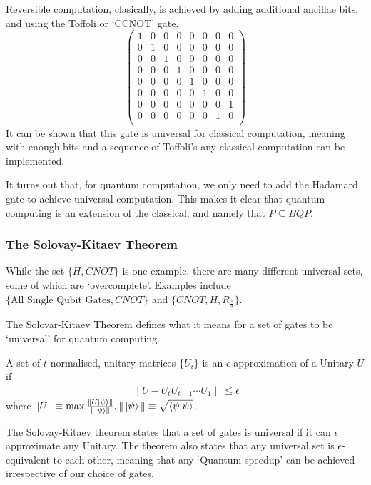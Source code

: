 \documentclass[11pt]{article}
\begin{document}
Reversible computation, clasically, is achieved by adding additional ancillae bits, and using the Toffoli or `CCNOT' gate.
\begin{equation}
    \begin{pmatrix}
        1 & 0 & 0 & 0 & 0 & 0 & 0 & 0\\
        0 & 1 & 0 & 0 & 0 & 0 & 0 & 0\\
        0 & 0 & 1 & 0 & 0 & 0 & 0 & 0\\
        0 & 0 & 0 & 1 & 0 & 0 & 0 & 0\\
        0 & 0 & 0 & 0 & 1 & 0 & 0 & 0\\
        0 & 0 & 0 & 0 & 0 & 1 & 0 & 0\\
        0 & 0 & 0 & 0 & 0 & 0 & 0 & 1\\
        0 & 0 & 0 & 0 & 0 & 0 & 1 & 0\\
    \end{pmatrix}
\end{equation}
It can be shown that this gate is universal for classical computation, meaning with enough bits and a sequence of Toffoli's any classical computation can be implemented.

It turns out that, for quantum computation, we only need to add the Hadamard gate to achieve universal computation. This makes it clear that quantum computing is an extension of the classical, and namely that $P \subseteq BQP$.

\subsubsection*{The Solovay-Kitaev Theorem}
While the set $\{ H, CNOT\}$ is one example, there are many different universal sets, some of which are `overcomplete'. Examples include $\{\text{All Single Qubit Gates},CNOT\}$ and $\{CNOT,H, R_{\frac{\pi}{4}}\}$.

The Solovar-Kitaev Theorem defines what it means for a set of gates to be `universal' for quantum computing.

A set of $t$ normalised, unitary matrices $\{U_{i}\}$ is an $\epsilon$-approximation of a Unitary $U$ if
\begin{align}
\| U - U_{t}U_{t-1}\cdots U_{1}\| \leq \epsilon
\end{align}
where $\|U\| \equiv \max \frac{\| U \ket{\psi}\|}{\|\ket{\psi}\|}, \|\ket{\psi}\| \equiv \sqrt{\braket{\psi}{\psi}}$.

The Solovay-Kitaev theorem states that a set of gates is universal if it can $\epsilon$ approximate any Unitary. The theorem also states that any universal set is $\epsilon$-equivalent to each other, meaning that any `Quantum speedup' can be achieved irrespective of our choice of gates.
\end{document}
